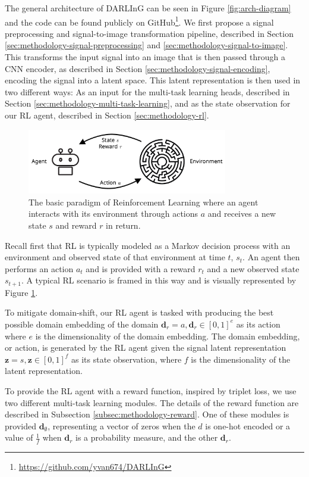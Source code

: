 The general architecture of DARLInG can be seen in Figure \ref{fig:arch-diagram} and the code can be found publicly on GitHub\footnote{\href{https://github.com/yvan674/DARLInG}{https://github.com/yvan674/DARLInG}}.
We first propose a signal preprocessing and signal-to-image transformation pipeline, described in Section \ref{sec:methodology-signal-preprocessing} and \ref{sec:methodology-signal-to-image}.
This transforms the input signal into an image that is then passed through a CNN encoder, as described in Section \ref{sec:methodology-signal-encoding}, encoding the signal into a latent space.
This latent representation is then used in two different ways: As an input for the multi-task learning heads, described in Section \ref{sec:methodology-multi-task-learning}, and as the state observation for our RL agent, described in Section \ref{sec:methodology-rl}.

\begin{figure}
	\centering
	\includegraphics[width=0.78\textwidth]{figures/rl_paradigm}
	\caption{The basic paradigm of Reinforcement Learning where an agent interacts with its environment through actions $a$ and receives a new state $s$ and reward $r$ in return.}\label{fig:rl-paradigm}
\end{figure}
Recall first that RL is typically modeled as a Markov decision process with an environment and observed state of that environment at time $t$, $s_t$. An agent then performs an action $a_t$ and is provided with a reward $r_t$ and a new observed state $s_{t+1}$.
A typical RL scenario is framed in this way and is visually represented by Figure \ref{fig:rl-paradigm}.

To mitigate domain-shift, our RL agent is tasked with producing the best possible domain embedding of the domain $\boldsymbol{d}_r = a, \boldsymbol{d}_r \in [0, 1]^e$ as its action where $e$ is the dimensionality of the domain embedding.
The domain embedding, or action, is generated by the RL agent given the signal latent representation $\boldsymbol{z} = s, \boldsymbol{z} \in [0, 1]^f$ as its state observation, where $f$ is the dimensionality of the latent representation.

To provide the RL agent with a reward function, inspired by triplet loss, we use two different multi-task learning modules.
The details of the reward function are described in Subsection \ref{subsec:methodology-reward}.
One of these modules is provided $\boldsymbol{d}_{\emptyset}$, representing a vector of zeros when the $d$ is one-hot encoded or a value of $\frac{1}{f}$ when $\boldsymbol{d}_r$ is a probability measure, and the other $\boldsymbol{d}_{r}$.

